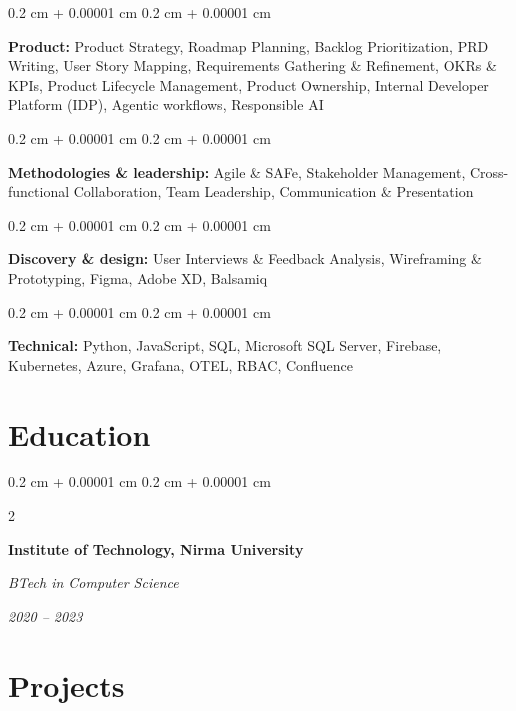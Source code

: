 \documentclass[10pt, letterpaper]{article}
\newenvironment{onecolentry}{
    \begin{adjustwidth}{
        0.2 cm + 0.00001 cm
    }{
        0.2 cm + 0.00001 cm
    }
}{
    \end{adjustwidth}
} %
\newenvironment{twocolentry}[2][]{
    \onecolentry
    \def\secondColumn{#2}
    \setcolumnwidth{\fill, 4.5 cm}
    \begin{paracol}{2}
}{
    \switchcolumn \raggedleft \secondColumn
    \end{paracol}
    \endonecolentry
} %
\begin{document}
        \begin{onecolentry}
            \textbf{Product:} Product Strategy, Roadmap Planning, Backlog Prioritization, PRD Writing, User Story Mapping, Requirements Gathering \& Refinement, OKRs \& KPIs, Product Lifecycle Management, Product Ownership, Internal Developer Platform (IDP), Agentic workflows, Responsible AI
        \end{onecolentry}

        \vspace{0.08 cm}

        \begin{onecolentry}
            \textbf{Methodologies \& leadership:} Agile \& SAFe, Stakeholder Management, Cross-functional Collaboration, Team Leadership, Communication \& Presentation
        \end{onecolentry}

        \vspace{0.08 cm}

        \begin{onecolentry}
            \textbf{Discovery \& design:} User Interviews \& Feedback Analysis, Wireframing \& Prototyping, Figma, Adobe XD, Balsamiq
        \end{onecolentry}

        \vspace{0.08 cm}

        \begin{onecolentry}
            \textbf{Technical:} Python, JavaScript, SQL, Microsoft SQL Server, Firebase, Kubernetes, Azure, Grafana, OTEL, RBAC, Confluence
        \end{onecolentry}

        \vspace{0.15 cm}

    \section{Education}

        \begin{twocolentry}{
        \textit{2020  –  2023}}
            \textbf{Institute of Technology, Nirma University}

            \textit{BTech in Computer Science}
        \end{twocolentry}

        \vspace{0.15 cm}

    \section{Projects}
\end{document}
